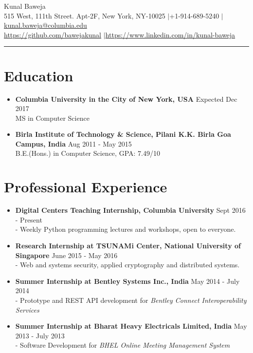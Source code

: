 \documentclass{article}
\def\name{Kunal Baweja}
\begin{document}
\begin{center}
{\huge \name}\\
515 West, 111th Street. Apt-2F, New York, NY-10025 $|$\hspace{3pt}+1-914-689-5240 $|$\hspace{3pt}\href{mailto:kunal.baweja@columbia.edu}{kunal.baweja@columbia.edu}\\
\vspace{2pt}
\href{https://github.com/bawejakunal}{https://github.com/bawejakunal} $|$\hspace{3pt}\href{https://www.linkedin.com/in/kunal-baweja}{https://www.linkedin.com/in/kunal-baweja}
\end{center}

\hrule
\vspace{5pt}

\section*{Education}
\begin{itemize}
    
    \item \textbf{Columbia University in the City of New York, USA} {\hfill Expected Dec 2017}\\
    MS in Computer Science
    
    \item \textbf{Birla Institute of Technology \& Science, Pilani K.K. Birla Goa Campus, India} {\hfill Aug 2011 - May 2015}\\
    B.E.(Hons.) in Computer Science, GPA: 7.49/10

\end{itemize}

\section*{Professional Experience}
\begin{itemize}
    \item \textbf{Digital Centers Teaching Internship, Columbia University} {\hfill Sept 2016 - Present}\\
    - Weekly Python programming lectures and workshops, open to everyone.

    \item \textbf{Research Internship at TSUNAMi Center, National University of Singapore} {\hfill June 2015 - May 2016}\\
    - Web and systems security, applied cryptography and distributed systems.
    
    \item \textbf{Summer Internship at Bentley Systems Inc., India} {\hfill May 2014 - July 2014}\\
    - Prototype and REST API development for \textit{Bentley Connect Interoperability Services}

    \item \textbf{Summer Internship at Bharat Heavy Electricals Limited, India} {\hfill May 2013 - July 2013}\\
    - Software Development for \textit{BHEL Online Meeting Management System}
\end{itemize}
\end{document}
